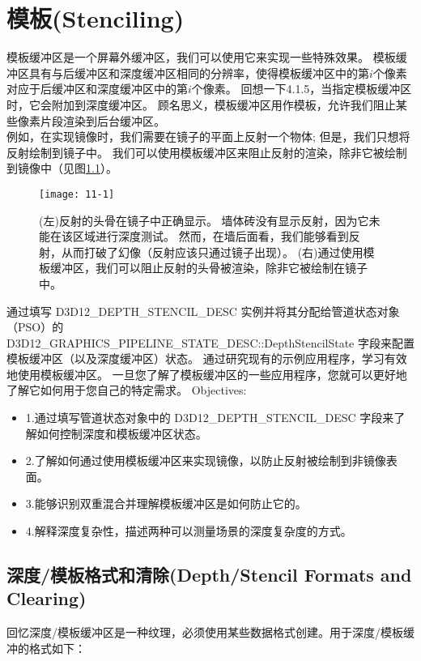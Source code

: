 \chapter{模板(Stenciling)}
\begin{flushleft}
模板缓冲区是一个屏幕外缓冲区，我们可以使用它来实现一些特殊效果。 模板缓冲区具有与后缓冲区和深度缓冲区相同的分辨率，使得模板缓冲区中的第$i$个像素对应于后缓冲区和深度缓冲区中的第$i$个像素。 回想一下4.1.5，当指定模板缓冲区时，它会附加到深度缓冲区。 顾名思义，模板缓冲区用作模板，允许我们阻止某些像素片段渲染到后台缓冲区。\\

例如，在实现镜像时，我们需要在镜子的平面上反射一个物体; 但是，我们只想将反射绘制到镜子中。 我们可以使用模板缓冲区来阻止反射的渲染，除非它被绘制到镜像中（见图\ref{fig:11-1}）。
\end{flushleft}

\begin{figure}[h]
    \texttt{[image: 11-1]}
    \centering
    \caption{(左)反射的头骨在镜子中正确显示。 墙体砖没有显示反射，因为它未能在该区域进行深度测试。 然而，在墙后面看，我们能够看到反射，从而打破了幻像（反射应该只通过镜子出现）。 (右)通过使用模板缓冲区，我们可以阻止反射的头骨被渲染，除非它被绘制在镜子中。}
    \label{fig:11-1}
\end{figure}

\begin{flushleft}
通过填写 D3D12\_DEPTH\_STENCIL\_DESC 实例并将其分配给管道状态对象（PSO）的 D3D12\_GRAPHICS\_PIPELINE\_STATE\_DESC::DepthStencilState 字段来配置模板缓冲区（以及深度缓冲区）状态。 通过研究现有的示例应用程序，学习有效地使用模板缓冲区。 一旦您了解了模板缓冲区的一些应用程序，您就可以更好地了解它如何用于您自己的特定需求。
{\large Objectives:}
\begin{itemize}
    \item 1.通过填写管道状态对象中的 D3D12\_DEPTH\_STENCIL\_DESC 字段来了解如何控制深度和模板缓冲区状态。
    \item 2.了解如何通过使用模板缓冲区来实现镜像，以防止反射被绘制到非镜像表面。
    \item 3.能够识别双重混合并理解模板缓冲区是如何防止它的。
    \item 4.解释深度复杂性，描述两种可以测量场景的深度复杂度的方式。
\end{itemize}
\end{flushleft}

\section{深度/模板格式和清除(Depth/Stencil Formats and Clearing)}
\begin{flushleft}
回忆深度/模板缓冲区是一种纹理，必须使用某些数据格式创建。用于深度/模板缓冲的格式如下：\\
\end{flushleft}

